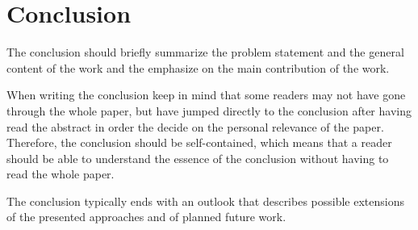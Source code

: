 \documentclass[10pt,a4paper,twoside,twocolumn]{article}
\begin{document}
\section{Conclusion\label{sec:conclusion}}

The conclusion should briefly summarize the problem statement and
the general content of the work and the emphasize on the main
contribution of the work.

When writing the conclusion keep in mind that some readers may not
have gone through the whole paper, but have jumped directly to the
conclusion after having read the abstract in order the decide on the
personal relevance of the paper. Therefore, the conclusion should be
self-contained, which means that a reader should be able to
understand the essence of the conclusion without having to read the
whole paper.

The conclusion typically ends with an outlook that describes
possible extensions of the presented approaches and of planned
future work.




\end{document}
